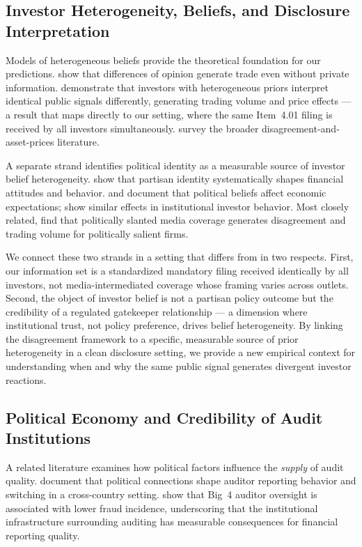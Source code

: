 \documentclass[12pt]{article}
\begin{document}
\subsection{Investor Heterogeneity, Beliefs, and Disclosure Interpretation}

Models of heterogeneous beliefs provide the theoretical foundation for
our predictions. \citet{harris1993} show that differences of opinion
generate trade even without private information. \citet{kandel1995}
demonstrate that investors with heterogeneous priors interpret identical
public signals differently, generating trading volume and price effects
--- a result that maps directly to our setting, where the same Item~4.01
filing is received by all investors simultaneously. \citet{hong2007}
survey the broader disagreement-and-asset-prices literature.

A separate strand identifies political identity as a measurable source
of investor belief heterogeneity. \citet{kempf2024} show that partisan
identity systematically shapes financial attitudes and behavior.
\citet{gerberhuber2009} and \citet{coibion2020} document that political
beliefs affect economic expectations; \citet{barrioshochberg2021} show
similar effects in institutional investor behavior. Most closely related,
\citet{goldmanetal2024} find that politically slanted media coverage
generates disagreement and trading volume for politically salient firms.

We connect these two strands in a setting that differs from
\citet{goldmanetal2024} in two respects. First, our information set is a
standardized mandatory filing received identically by all investors, not
media-intermediated coverage whose framing varies across outlets. Second,
the object of investor belief is not a partisan policy outcome but the
credibility of a regulated gatekeeper relationship --- a dimension where
institutional trust, not policy preference, drives belief heterogeneity.
By linking the disagreement framework to a specific, measurable source of
prior heterogeneity in a clean disclosure setting, we provide a new
empirical context for understanding when and why the same public signal
generates divergent investor reactions.

\subsection{Political Economy and Credibility of Audit Institutions}
\label{sec:pol_markets}

A related literature examines how political factors influence the
\emph{supply} of audit quality. \citet{chan2006} document that political
connections shape auditor reporting behavior and switching in a cross-country
setting. \citet{lennox2010} show that Big~4 auditor oversight is associated
with lower fraud incidence, underscoring that the institutional
infrastructure surrounding auditing has measurable consequences for
financial reporting quality.
\end{document}
